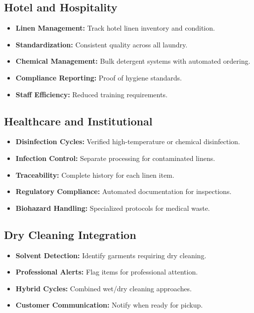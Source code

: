 \subsection{Hotel and Hospitality}
\begin{itemize}
    \item \textbf{Linen Management:} Track hotel linen inventory and condition.
    \item \textbf{Standardization:} Consistent quality across all laundry.
    \item \textbf{Chemical Management:} Bulk detergent systems with automated ordering.
    \item \textbf{Compliance Reporting:} Proof of hygiene standards.
    \item \textbf{Staff Efficiency:} Reduced training requirements.
\end{itemize}

\subsection{Healthcare and Institutional}
\begin{itemize}
    \item \textbf{Disinfection Cycles:} Verified high-temperature or chemical disinfection.
    \item \textbf{Infection Control:} Separate processing for contaminated linens.
    \item \textbf{Traceability:} Complete history for each linen item.
    \item \textbf{Regulatory Compliance:} Automated documentation for inspections.
    \item \textbf{Biohazard Handling:} Specialized protocols for medical waste.
\end{itemize}

\subsection{Dry Cleaning Integration}
\begin{itemize}
    \item \textbf{Solvent Detection:} Identify garments requiring dry cleaning.
    \item \textbf{Professional Alerts:} Flag items for professional attention.
    \item \textbf{Hybrid Cycles:} Combined wet/dry cleaning approaches.
    \item \textbf{Customer Communication:} Notify when ready for pickup.
\end{itemize}

